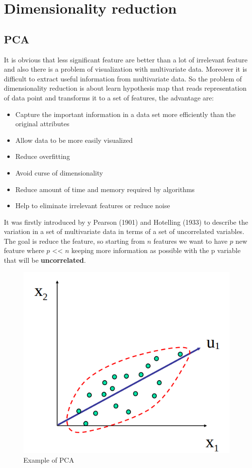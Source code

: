 \chapter{Dimensionality reduction}
\section{PCA}

It is obvious that less significant feature are better than a lot of irrelevant feature and also there is a problem of visualization with multivariate data. Moreover it is difficult to extract useful information from multivariate data.
So the problem of dimensionality reduction is about learn hypothesis map that reads representation of data point and transforms it to a set of features, the advantage are:
\begin{itemize}
    \item Capture the important information in a data set more efficiently than the original attributes
    \item Allow data to be more easily visualized
    \item Reduce overfitting
    \item Avoid curse of dimensionality
    \item Reduce amount of time and memory required by algorithms
    \item Help to eliminate irrelevant features or reduce noise
\end{itemize}

It was firstly introduced by y Pearson (1901) and Hotelling (1933) to describe the variation in a set of multivariate data in terms of a set of uncorrelated variables. The goal is reduce the feature, so starting from $n$ features we want to have $p$ new feature where $p$ << $n$ keeping more information as possible with the p variable that will be \textbf{uncorrelated}.

\begin{figure}[H]
    \centering
    \includegraphics[scale=0.65]{images/DimRed/PCA1.png}
    \caption{Example of PCA}
    \label{fig:PCA}
\end{figure}


